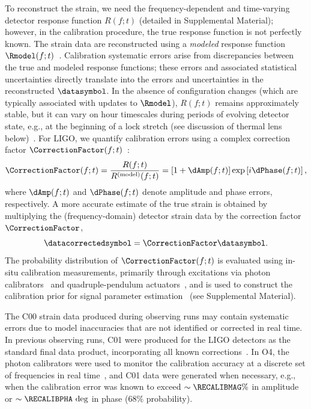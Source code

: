 To reconstruct the strain, we need the frequency-dependent and time-varying detector response function $R(f;t)$ (detailed in Supplemental Material\citesupp); however, in the calibration procedure, the true response function is not perfectly known.
The strain data are reconstructed using a \emph{modeled} response function $\Rmodel(f;t)$~\cite{LIGOScientific:2016xax,LIGOScientific:2017aaj,Sun:2020wke}.
Calibration systematic errors arise from discrepancies between the true and modeled response functions; these errors and associated statistical uncertainties directly translate into the errors and uncertainties in the reconstructed $\datasymbol$.
In the absence of configuration changes (which are typically associated with updates to $\Rmodel$), $R(f;t)$ remains approximately stable, but it can vary on hour timescales during periods of evolving detector state, e.g., at the beginning of a lock stretch (see discussion of thermal lens below)~\cite{O4Unc}.
For \ac{LIGO}, we quantify calibration errors using a complex correction factor $\CorrectionFactor(f;t)$~\cite{Allen:1996aaa,Sun:2020wke}:
\begin{equation}
	\CorrectionFactor(f;t) = \frac{R(f;t)}{R^{\mathrm{(model)}}(f;t)} = \left[1+\dAmp(f;t) \right]\exp\left[i \dPhase(f;t)\right],
	\label{eq:correction_factor}
\end{equation}
where $\dAmp(f;t)$ and $\dPhase(f;t)$ denote amplitude and phase errors, respectively.
A more accurate estimate of the true strain is obtained by multiplying the (frequency-domain) detector strain data by the correction factor $\CorrectionFactor$,
\begin{equation}
	\datacorrectedsymbol = \CorrectionFactor \datasymbol .
\end{equation}
The probability distribution of $\CorrectionFactor(f;t)$ is evaluated using in-situ calibration measurements, primarily through excitations via photon calibrators~\cite{Karki:2016pht,Estevez:2020pvj,Bhattacharjee:2020yxe,Chen:2025kyn} and quadruple-pendulum actuators~\cite{Sun:2020wke,Wade:2025tgt}, and is used to construct the calibration prior for signal parameter estimation~\cite{LIGOScientific:2025yae} (see Supplemental Material\citesupp).

The \ac{C00} strain data produced during observing runs may contain systematic errors due to model inaccuracies that are not identified or corrected in real time.
In previous observing runs, \ac{C01} were produced for the \ac{LIGO} detectors as the standard final data product, incorporating all known corrections~\cite{LIGOScientific:2016xax,LIGOScientific:2017aaj,Sun:2020wke}.
In \ac{O4}, the photon calibrators were used to monitor the calibration accuracy at a discrete set of frequencies in real time~\cite{VIRGO:2021umk,Wade:2025tgt}, and \ac{C01} data were generated when necessary, e.g., when the calibration error was known to exceed $\sim \RECALIBMAG\%$ in amplitude or $\sim \RECALIBPHA~\mathrm{deg}$ in phase ($68\%$ probability).

